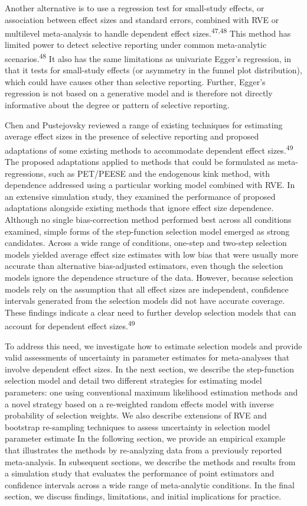 \documentclass[
  american,
  man, donotrepeattitle,floatsintext]{apa7}
\begin{document}
Another alternative is to use a regression test for small-study effects, or association between effect sizes and standard errors, combined with RVE or multilevel meta-analysis to handle dependent effect sizes.\textsuperscript{47,48}
This method has limited power to detect selective reporting under common meta-analytic scenarios.\textsuperscript{48}
It also has the same limitations as univariate Egger's regression, in that it tests for small-study effects (or asymmetry in the funnel plot distribution), which could have causes other than selective reporting.
Further, Egger's regression is not based on a generative model and is therefore not directly informative about the degree or pattern of selective reporting.

Chen and Pustejovsky reviewed a range of existing techniques for estimating average effect sizes in the presence of selective reporting and proposed adaptations of some existing methods to accommodate dependent effect sizes.\textsuperscript{49}
The proposed adaptations applied to methods that could be formulated as meta-regressions, such as PET/PEESE and the endogenous kink method, with dependence addressed using a particular working model combined with RVE.
In an extensive simulation study, they examined the performance of proposed adaptations alongside existing methods that ignore effect size dependence.
Although no single bias-correction method performed best across all conditions examined, simple forms of the step-function selection model emerged as strong candidates.
Across a wide range of conditions, one-step and two-step selection models yielded average effect size estimates with low bias that were usually more accurate than alternative bias-adjusted estimators, even though the selection models ignore the dependence structure of the data.
However, because selection models rely on the assumption that all effect sizes are independent, confidence intervals generated from the selection models did not have accurate coverage.
These findings indicate a clear need to further develop selection models that can account for dependent effect sizes.\textsuperscript{49}

To address this need, we investigate how to estimate selection models and provide valid assessments of uncertainty in parameter estimates for meta-analyses that involve dependent effect sizes.
In the next section, we describe the step-function selection model and detail two different strategies for estimating model parameters: one using conventional maximum likelihood estimation methods and a novel strategy based on a re-weighted random effects model with inverse probability of selection weights.
We also describe extensions of RVE and bootstrap re-sampling techniques to assess uncertainty in selection model parameter estimate
In the following section, we provide an empirical example that illustrates the methods by re-analyzing data from a previously reported meta-analysis.
In subsequent sections, we describe the methods and results from a simulation study that evaluates the performance of point estimators and confidence intervals across a wide range of meta-analytic conditions.
In the final section, we discuss findings, limitations, and initial implications for practice.
\end{document}
